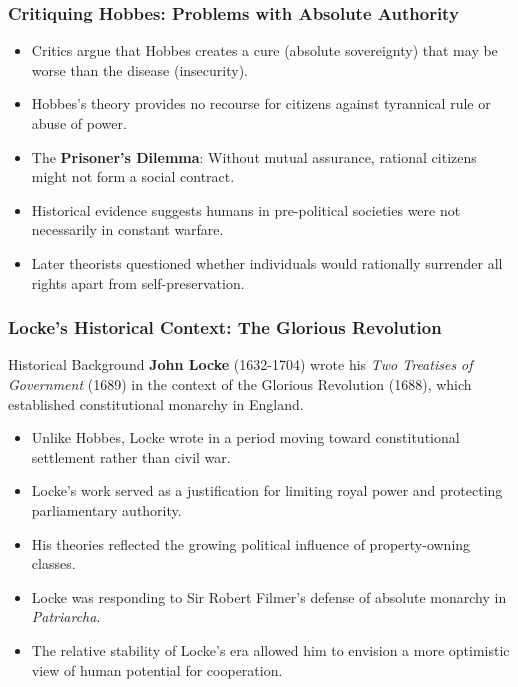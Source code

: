 \documentclass[aspectratio=169]{beamer}
\begin{document}
\begin{frame}
  \frametitle{Critiquing Hobbes: Problems with Absolute Authority}
  
  \begin{itemize}
    \item Critics argue that Hobbes creates a cure (absolute sovereignty) that may be worse than the disease (insecurity).
    \item Hobbes's theory provides no recourse for citizens against tyrannical rule or abuse of power.
    \item The \textbf{Prisoner's Dilemma}: Without mutual assurance, rational citizens might not form a social contract.
    \item Historical evidence suggests humans in pre-political societies were not necessarily in constant warfare.
    \item Later theorists questioned whether individuals would rationally surrender all rights apart from self-preservation.
  \end{itemize}
\end{frame}

\begin{frame}
  \frametitle{Locke's Historical Context: The Glorious Revolution}
  
  \begin{alertblock}{Historical Background}
    \textbf{John Locke} (1632-1704) wrote his \textit{Two Treatises of Government} (1689) in the context of the Glorious Revolution (1688), which established constitutional monarchy in England.
  \end{alertblock}
  
  \begin{itemize}
    \item Unlike Hobbes, Locke wrote in a period moving toward constitutional settlement rather than civil war.
    \item Locke's work served as a justification for limiting royal power and protecting parliamentary authority.
    \item His theories reflected the growing political influence of property-owning classes.
    \item Locke was responding to Sir Robert Filmer's defense of absolute monarchy in \textit{Patriarcha}.
    \item The relative stability of Locke's era allowed him to envision a more optimistic view of human potential for cooperation.
  \end{itemize}
\end{frame}
\end{document}
